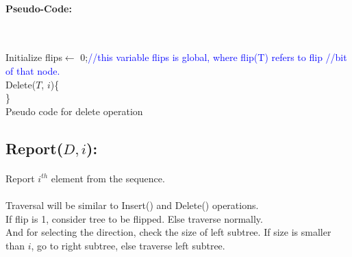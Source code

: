 \documentclass[pdftex,a4paper,12pt]{report}
\begin{document}
\paragraph{Pseudo-Code:} \mbox{} \\
\begin{algorithm}
Initialize flips$\gets$ 0;\makebox[40pt]{}\textcolor{blue}{//this variable flips is global, where flip(T) refers to
 flip \makebox[150pt]{}//bit of that node.}\\
Delete($T$, $i$)\{\\
\}\\
\caption{Pseudo code for delete operation}
\end{algorithm}

\newpage
\subsection{Report($D, i$):} 
\paragraph{} Report $i^{th}$ element from the sequence.\\\\
Traversal will be similar to Insert() and Delete() operations.\\
If flip is 1, consider tree to be flipped. Else traverse normally.\\
And for selecting the direction, check the size of left subtree. If size is smaller than $i$, go to 
right subtree, else traverse left subtree.\\\\
\end{document}

